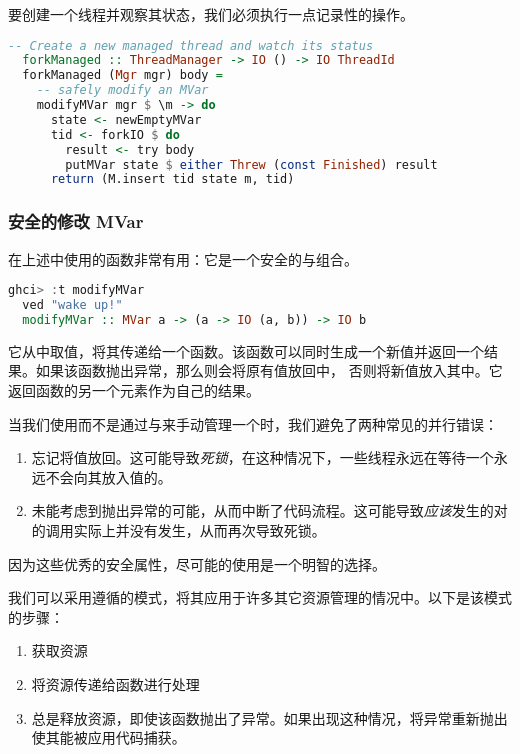 \documentclass[./main.tex]{subfiles}
\begin{document}
要创建一个线程并观察其状态，我们必须执行一点记录性的操作。

\begin{lstlisting}[language=Haskell]
  -- Create a new managed thread and watch its status
  forkManaged :: ThreadManager -> IO () -> IO ThreadId
  forkManaged (Mgr mgr) body =
    -- safely modify an MVar
    modifyMVar mgr $ \m -> do
      state <- newEmptyMVar
      tid <- forkIO $ do
        result <- try body
        putMVar state $ either Threw (const Finished) result
      return (M.insert tid state m, tid)
\end{lstlisting}

\subsubsection*{安全的修改 MVar}

在上述中使用的函数非常有用：它是一个安全的与组合。

\begin{lstlisting}[language=Haskell]
  ghci> :t modifyMVar
  ved "wake up!"
  modifyMVar :: MVar a -> (a -> IO (a, b)) -> IO b
\end{lstlisting}

它从中取值，将其传递给一个函数。该函数可以同时生成一个新值并返回一个结果。如果该函数抛出异常，那么则会将原有值放回中，
否则将新值放入其中。它返回函数的另一个元素作为自己的结果。

当我们使用而不是通过与来手动管理一个时，我们避免了两种常见的并行错误：

\begin{enumerate}
  \item 忘记将值放回。这可能导致\textit{死锁}，在这种情况下，一些线程永远在等待一个永远不会向其放入值的。
  \item 未能考虑到抛出异常的可能，从而中断了代码流程。这可能导致\textit{应该}发生的对的调用实际上并没有发生，从而再次导致死锁。
\end{enumerate}

因为这些优秀的安全属性，尽可能的使用是一个明智的选择。

我们可以采用遵循的模式，将其应用于许多其它资源管理的情况中。以下是该模式的步骤：

\begin{enumerate}
  \item 获取资源
  \item 将资源传递给函数进行处理
  \item 总是释放资源，即使该函数抛出了异常。如果出现这种情况，将异常重新抛出使其能被应用代码捕获。
\end{enumerate}
\end{document}
